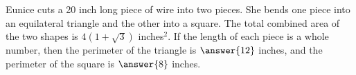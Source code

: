 \documentclass{ximera}
\author{Kenneth Berglund}
\begin{document}
\begin{exercise}
Eunice cuts a 20 inch long piece of wire into two pieces. She bends one piece into an equilateral triangle and the other into a square. The total combined area of the two shapes is $4(1 + \sqrt{3})$ inches$^2$. If the length of each piece is a whole number, then the perimeter of the triangle is $\answer{12}$ inches, and the perimeter of the square is $\answer{8}$ inches.


\end{exercise}
\end{document}

